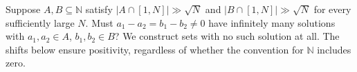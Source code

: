 Suppose $A,B\subseteq\mathbb N$ satisfy $|A\cap[1,N]|\gg\sqrt N$ and $|B\cap[1,N]|\gg\sqrt N$ for every sufficiently large $N$. Must $a_1-a_2=b_1-b_2\ne0$ have infinitely many solutions with $a_1,a_2\in A$, $b_1,b_2\in B$? We construct sets with no such solution at all. The shifts below ensure positivity, regardless of whether the convention for $\mathbb N$ includes zero.
